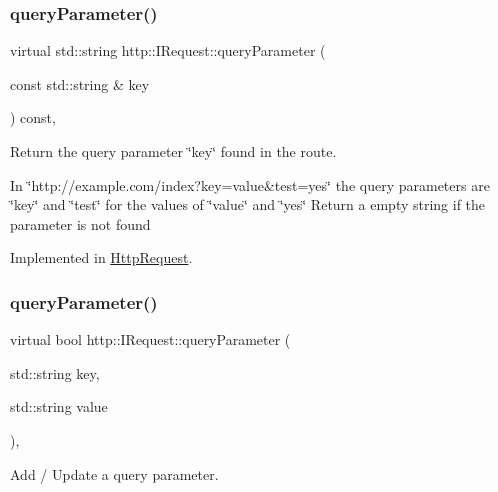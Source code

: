 \subsubsection{\texorpdfstring{query\+Parameter()}{queryParameter()}\hspace{0.1cm}{\footnotesize\ttfamily [1/2]}}
{\footnotesize\ttfamily virtual std\+::string http\+::\+I\+Request\+::query\+Parameter (\begin{DoxyParamCaption}\item[{const std\+::string \&}]{key }\end{DoxyParamCaption}) const\hspace{0.3cm}{\ttfamily [pure virtual]}, {\ttfamily [noexcept]}}



Return the query parameter \char`\"{}key\char`\"{} found in the route. 

In \char`\"{}http\+://example.\+com/index?key=value\&test=yes\char`\"{} the query parameters are \char`\"{}key\char`\"{} and \char`\"{}test\char`\"{} for the values of \char`\"{}value\char`\"{} and \char`\"{}yes\char`\"{} Return a empty string if the parameter is not found 

Implemented in \hyperlink{classHttpRequest_a10cef7d5ff51ddc7eb5ebd2f25a0f66c}{Http\+Request}.

\mbox{\label{structhttp_1_1IRequest_aded13d22f58bf5f622524929a52de7ef}} 
\subsubsection{\texorpdfstring{query\+Parameter()}{queryParameter()}\hspace{0.1cm}{\footnotesize\ttfamily [2/2]}}
{\footnotesize\ttfamily virtual bool http\+::\+I\+Request\+::query\+Parameter (\begin{DoxyParamCaption}\item[{std\+::string}]{key,  }\item[{std\+::string}]{value }\end{DoxyParamCaption})\hspace{0.3cm}{\ttfamily [pure virtual]}, {\ttfamily [noexcept]}}



Add / Update a query parameter. 


